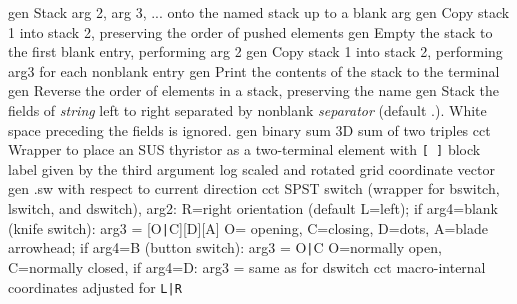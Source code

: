   {gen}
  {Stack arg 2, arg 3, ... onto the named stack up to a blank arg}
  {gen}
  {Copy stack 1 into stack 2, preserving the order of pushed
  elements}
  {gen}
  {Empty the stack to the first blank entry, performing arg 2}
  {gen}
  {Copy stack 1 into stack 2, performing arg3 for each nonblank
  entry}
  {gen}
  {Print the contents of the stack to the terminal}
  {gen}
  {Reverse the order of elements in a stack, preserving the name}
  {gen}
  {Stack the fields of {\sl string} left to right separated
  by nonblank
    {\sl separator} (default .).  White space preceding the fields
    is ignored.}
  {gen}
  {binary sum}
  {3D} {sum of two triples}
  {cct}
  {Wrapper to place an SUS thyristor as a two-terminal element with
   {\tt [ ]} block label given by the third argument
    }
  {log}
  {scaled and rotated grid coordinate vector}
  {gen}
  {.sw with respect to current direction}
  {cct}
  {SPST switch (wrapper for bswitch, lswitch, and dswitch),
    arg2: R=right orientation (default L=left);
     if arg4=blank (knife switch): arg3 = [O{\tt|}C][D][A]
       O= opening, C=closing, D=dots, A=blade arrowhead;
     if arg4=B (button switch): arg3 = O{\tt|}C
       O=normally open, C=normally closed,
     if arg4=D: arg3 = same as for dswitch }
%
  {cct}
  {macro-internal coordinates adjusted for {\tt L|R}}
